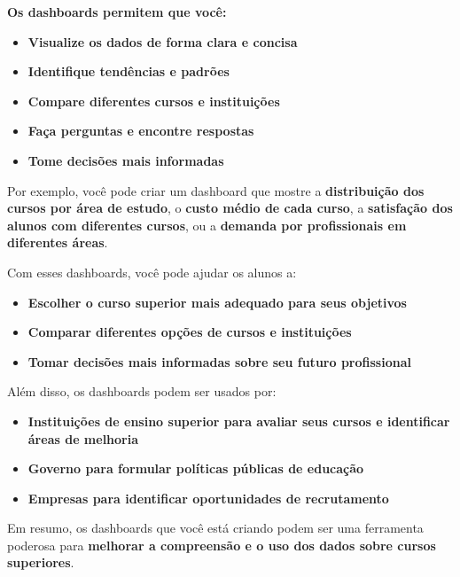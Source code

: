 \documentclass[a4paper]{article}
\newcommand\textstyleListLabelx[1]{\textrm{#1}}
\newcommand\textstyleListLabelxix[1]{\textrm{#1}}
\newcommand\textstyleListLabelxxviii[1]{\textrm{#1}}
\begin{document}
\textbf{\textcolor[HTML]{1F1F1F}{Os dashboards permitem que você:}}

\begin{itemize}[series=listWWNumii,label=\textstyleListLabelx{[F0B7?]}]
\item \textbf{\textcolor[HTML]{1F1F1F}{Visualize os dados de forma clara e concisa}}
\item \textbf{\textcolor[HTML]{1F1F1F}{Identifique tendências e padrões}}
\item \textbf{\textcolor[HTML]{1F1F1F}{Compare diferentes cursos e instituições}}
\item \textbf{\textcolor[HTML]{1F1F1F}{Faça perguntas e encontre respostas}}
\item \textbf{\textcolor[HTML]{1F1F1F}{Tome decisões mais informadas}}
\end{itemize}
\textcolor[HTML]{1F1F1F}{Por exemplo, você pode criar um dashboard que mostre a
}\textbf{\textcolor[HTML]{1F1F1F}{distribuição dos cursos por área de estudo}}\textcolor[HTML]{1F1F1F}{, o
}\textbf{\textcolor[HTML]{1F1F1F}{custo médio de cada curso}}\textcolor[HTML]{1F1F1F}{, a
}\textbf{\textcolor[HTML]{1F1F1F}{satisfação dos alunos com diferentes cursos}}\textcolor[HTML]{1F1F1F}{, ou a
}\textbf{\textcolor[HTML]{1F1F1F}{demanda por profissionais em diferentes áreas}}\textcolor[HTML]{1F1F1F}{.}

\textcolor[HTML]{1F1F1F}{Com esses dashboards, você pode ajudar os alunos a:}

\begin{itemize}[series=listWWNumiii,label=\textstyleListLabelxix{[F0B7?]}]
\item \textbf{\textcolor[HTML]{1F1F1F}{Escolher o curso superior mais adequado para seus objetivos}}
\item \textbf{\textcolor[HTML]{1F1F1F}{Comparar diferentes opções de cursos e instituições}}
\item \textbf{\textcolor[HTML]{1F1F1F}{Tomar decisões mais informadas sobre seu futuro profissional}}
\end{itemize}
\textcolor[HTML]{1F1F1F}{Além disso, os dashboards podem ser usados por:}

\begin{itemize}[series=listWWNumiv,label=\textstyleListLabelxxviii{[F0B7?]}]
\item \textbf{\textcolor[HTML]{1F1F1F}{Instituições de ensino superior para avaliar seus cursos e identificar áreas de
melhoria}}
\item \textbf{\textcolor[HTML]{1F1F1F}{Governo para formular políticas públicas de educação}}
\item \textbf{\textcolor[HTML]{1F1F1F}{Empresas para identificar oportunidades de recrutamento}}
\end{itemize}
\textcolor[HTML]{1F1F1F}{Em resumo, os dashboards que você está criando podem ser uma ferramenta poderosa para
}\textbf{\textcolor[HTML]{1F1F1F}{melhorar a compreensão e o uso dos dados sobre cursos
superiores}}\textcolor[HTML]{1F1F1F}{.}
\end{document}
